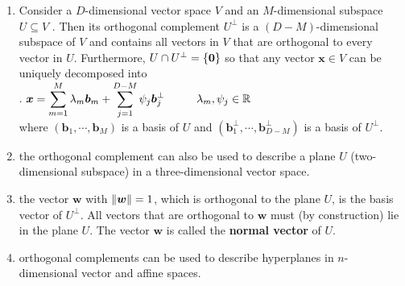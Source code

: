 \begin{enumerate}
    \item Consider a $D$-dimensional vector space $V$ and an $M$-dimensional subspace $U \subseteq V$ .
    Then its orthogonal complement $U^\perp$ is a $(D-M)$-dimensional subspace of $V$ and contains all vectors in $V$ that are orthogonal to every vector in $U$.
    Furthermore, $U \cap U^\perp = \left\{\bm{0}\right\}$ so that any vector $\bm{x} \in V$ can be uniquely decomposed into
    \hfill \cite{mfml/book/mml/Deisenroth-Faisal-Ong}
    \\
    .\hfill
    $
        \bm{x}
        = \displaystyle\sum^M_{m=1} \lambda_m \bm{b}_m + \displaystyle\sum ^{D-M}_{j=1} \psi_j \bm{b}_j^\perp
        \hspace{1cm}
        \lambda_m, \psi_j \in \mathbb{R}
    $
    \hfill \cite{mfml/book/mml/Deisenroth-Faisal-Ong}
    \\
    where $(\bm{b}_1, \cdots , \bm{b}_M)$ is a basis of $U$ and $(\bm{b}^\perp _1 , \cdots , \bm{b}^\perp _{D-M})$ is a basis of $U^\perp$.
    \hfill \cite{mfml/book/mml/Deisenroth-Faisal-Ong}

    \item the orthogonal complement can also be used to describe a plane $U$ (two-dimensional subspace) in a three-dimensional vector space.
    \hfill \cite{mfml/book/mml/Deisenroth-Faisal-Ong}

    \item the vector $\bm{w}$ with $\left\| \bm{w} \right\| = 1$, which is orthogonal to the plane $U$, is the basis vector of $U^\perp$.
    All vectors that are orthogonal to $\bm{w}$ must (by construction) lie in the plane $U$.
    The vector $\bm{w}$ is called the \textbf{normal vector} of $U$.
    \hfill \cite{mfml/book/mml/Deisenroth-Faisal-Ong}

    \item orthogonal complements can be used to describe hyperplanes in $n$-dimensional vector and affine spaces.
    \hfill \cite{mfml/book/mml/Deisenroth-Faisal-Ong}
\end{enumerate}




































